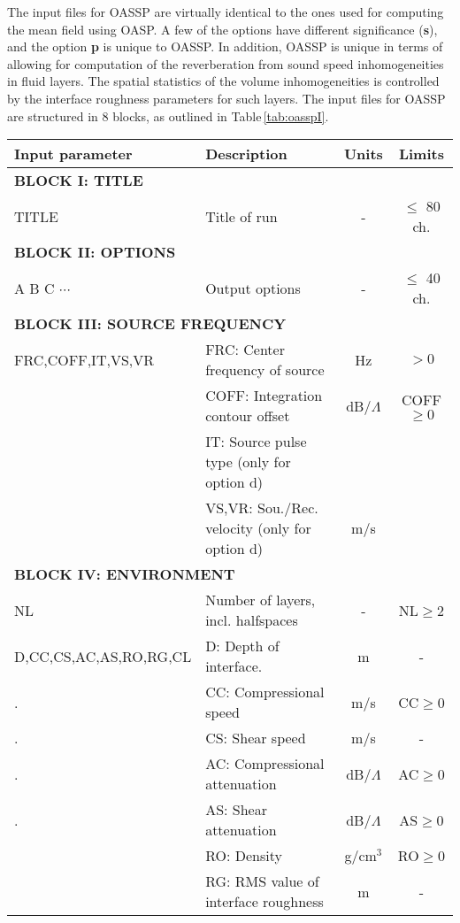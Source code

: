 The input files for OASSP are virtually identical to the ones used for
computing the mean field using OASP. A few of the options have
different significance ({\bf s}), and the option {\bf p } is unique to
OASSP. In addition, OASSP is unique in terms of allowing for
computation of the reverberation from sound speed inhomogeneities in
fluid layers. The spatial statistics of the volume inhomogeneities is
controlled by the interface roughness parameters for such layers.
The input files for OASSP are structured in 8 blocks,
as outlined in Table\,\ref{tab:oasspI}. 
\begin{table}
\begin{center}
\small
\begin{tabular}{|l|l|c|c|}
\hline \hline
Input parameter & Description & Units & Limits \\
\hline \hline
\multicolumn{4}{|l|}{\bf BLOCK I: TITLE } \\
\hline
TITLE & Title of run  & - & $\leq$ 80 ch. \\
\hline
\multicolumn{4}{|l|}{\bf BLOCK II: OPTIONS} \\
\hline
A B C $\cdots$ & Output options & - & $\leq$ 40 ch. \\
\hline
\multicolumn{4}{|l|}{\bf BLOCK III: SOURCE FREQUENCY} \\
\hline
FRC,COFF,IT,VS,VR & FRC: Center frequency of source & Hz & $>0$ \\
 	& COFF: Integration contour offset & dB/$\Lambda$ & COFF$\geq 0$ \\
        & IT: Source pulse type (only for option d) & & \\
	& VS,VR: Sou./Rec. velocity  (only for option d) & m/s & \\
\hline
\multicolumn{4}{|l|}{\bf BLOCK IV: ENVIRONMENT} \\
\hline
NL 	& Number of layers, incl. halfspaces	& - & NL$\geq 2$  \\
D,CC,CS,AC,AS,RO,RG,CL & D: Depth of interface. & m & - \\
.	& CC: Compressional speed & m/s & CC$\geq 0$ \\
.	& CS: Shear speed & m/s & - \\
.	& AC: Compressional attenuation & dB/$\Lambda$ & AC$\geq 0$ \\
.	& AS: Shear attenuation & dB/$\Lambda$ & AS$\geq 0$ \\
	& RO: Density 	& g/cm$^{3}$ & RO$\geq 0$ \\
	& RG: RMS value of interface roughness & m & - \\

\end{tabular}
\end{center}
\end{table}
